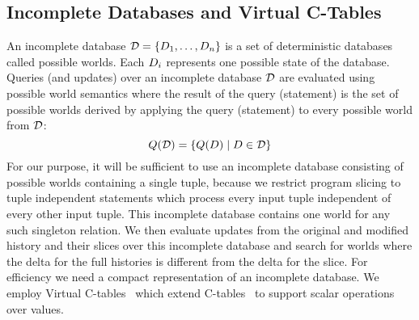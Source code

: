 \subsection{Incomplete Databases and Virtual C-Tables}
\label{sec:vc-tb}
An incomplete database $\mathcal{D} = \{ D_1, \ldots, D_n \}$ is a set of deterministic databases called possible worlds. Each $D_i$ represents one possible state of the database. Queries (and updates) over an incomplete database $\mathcal{D}$ are evaluated using possible world semantics where the result of the query (statement) is the set of possible worlds derived by applying the query (statement) to every possible world from $\mathcal{D}$: %
%
$$Q(\mathcal{D}) = \{ Q(D) \mid D \in \mathcal{D} \}$$
%
For our purpose, it will be sufficient to use an incomplete database consisting of possible worlds containing a single tuple, because we restrict program slicing to tuple independent statements which process every input tuple independent of every other input tuple.
This incomplete database contains one world for any such singleton relation.
We then evaluate updates from the original and modified history and their slices over this incomplete database and search for worlds where the delta for the full histories is different from the delta for the slice.
For efficiency we need a compact representation of an incomplete database. We employ Virtual C-tables~\cite{pip10,lenses15} which extend C-tables~\cite{IL84a} to support scalar operations over values.

